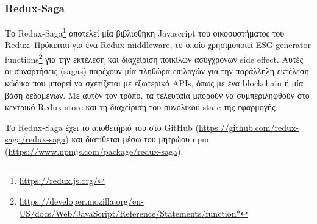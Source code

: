 \subsubsection{Redux-Saga} \label{subsection:4-2-2-3-redux-saga}


Το Redux-Saga\footnote{\url{https://redux.js.org/}} αποτελεί μία βιβλιοθήκη Javascript του οικοσυστήματος του Redux. Πρόκειται για ένα Redux middleware, το οποίο χρησιμοποιεί ESG generator functions\footnote{\url{https://developer.mozilla.org/en-US/docs/Web/JavaScript/Reference/Statements/function*}} για την εκτέλεση και διαχείριση ποικίλων ασύγχρονων side effect. Αυτές οι συναρτήσεις (sagas) παρέχουν μία πληθώρα επιλογών για την παράλληλη εκτέλεση κώδικα που μπορεί να σχετίζεται με εξωτερικά APIs, όπως με ένα blockchain ή μία βάση δεδομένων. Με αυτόν τον τρόπο, τα τελευταία μπορούν να συμπεριληφθούν στο κεντρικό Redux store και τη διαχείριση του συνολικού state της εφαρμογής.

Το Redux-Saga έχει το αποθετήριό του στο GitHub (\url{https://github.com/redux-saga/redux-saga}) και διατίθεται μέσω του μητρώου npm (\url{https://www.npmjs.com/package/redux-saga}).
